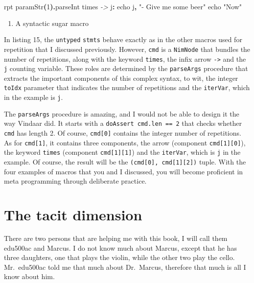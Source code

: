 \documentclass[
  12pt,
]{book}
\newenvironment{Shaded}{}{}
\newcommand{\CommentTok}[1]{\textcolor[rgb]{0.38,0.63,0.69}{\textit{#1}}}
\newcommand{\DataTypeTok}[1]{\textcolor[rgb]{0.56,0.13,0.00}{#1}}
\newcommand{\DecValTok}[1]{\textcolor[rgb]{0.25,0.63,0.44}{#1}}
\newcommand{\KeywordTok}[1]{\textcolor[rgb]{0.00,0.44,0.13}{\textbf{#1}}}
\newcommand{\NormalTok}[1]{#1}
\newcommand{\StringTok}[1]{\textcolor[rgb]{0.25,0.44,0.63}{#1}}
\providecommand{\tightlist}{%
  \setlength{\itemsep}{0pt}\setlength{\parskip}{0pt}}
\begin{document}
\begin{Shaded}
\begin{Highlighting}[]
\DataTypeTok{rpt} \DataTypeTok{paramStr}\KeywordTok{(}\DecValTok{1}\KeywordTok{).}\DataTypeTok{parseInt}\NormalTok{ times }\CommentTok{{-}\textgreater{}}\NormalTok{ j}\KeywordTok{:}
    \DataTypeTok{echo}\NormalTok{ j}\KeywordTok{,} \StringTok{"{-} Give me some beer"}
    \DataTypeTok{echo} \StringTok{"Now"}
\end{Highlighting}
\end{Shaded}

\begin{enumerate}
\def\labelenumi{(\arabic{enumi})}
\setcounter{enumi}{14}
\tightlist
\item
  A syntactic sugar macro
\end{enumerate}

In listing 15, the \texttt{untyped} \texttt{stmts} behave exactly as in
the other macros used for repetition that I discussed previously.
However, \texttt{cmd} is a \texttt{NimNode} that bundles the number of
repetitions, along with the keyword \texttt{times}, the infix arrow
\texttt{-\textgreater{}} and the \texttt{j} counting variable. These
roles are determined by the \texttt{parseArgs} procedure that extracts
the important components of this complex syntax, to wit, the integer
\texttt{toIdx} parameter that indicates the number of repetitions and
the \texttt{iterVar}, which in the example is \texttt{j}.

The \texttt{parseArgs} procedure is amazing, and I would not be able to
design it the way Vindaar did. It starts with a
\texttt{doAssert\ cmd.len\ ==\ 2} that checks whether \texttt{cmd} has
length 2. Of course, \texttt{cmd{[}0{]}} contains the integer number of
repetitions. As for \texttt{cmd{[}1{]}}, it contains three components,
the arrow (component \texttt{cmd{[}1{]}{[}0{]}}), the keyword
\texttt{times} (component \texttt{cmd{[}1{]}{[}1{]}}) and the
\texttt{iterVar}, which is \texttt{j} in the example. Of course, the
result will be the \texttt{(cmd{[}0{]},\ cmd{[}1{]}{[}2{]})} tuple. With
the four examples of macros that you and I discussed, you will become
proficient in meta programming through deliberate practice.

\chapter{The tacit dimension}\label{the-tacit-dimension}

\label{chap:tacit} There are two persons that are helping me with this
book, I will call them edu500ac and Marcus. I do not know much about
Marcus, except that he has three daughters, one that plays the violin,
while the other two play the cello. Mr.~edu500ac told me that much about
Dr.~Marcus, therefore that much is all I know about him.
\end{document}
